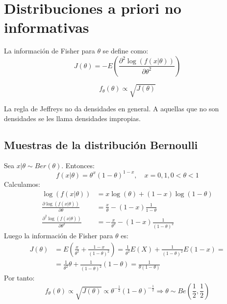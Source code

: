 \section{Distribuciones a priori no informativas}
\begin{definition}
    La información de Fisher para $\theta$ se define como:
    $$J(\theta) = -E\left(\frac{\partial^2 \log(f(x|\theta))}{\partial\theta^2}\right)$$
\end{definition}

\begin{proposition}
    $$f_\theta(\theta) \propto \sqrt{J(\theta)}$$
\end{proposition}

\begin{remark}
    La regla de Jeffreys no da densidades en general.
    A aquellas que no son densidades se les llama densidades impropias.
\end{remark}

\subsection*{Muestras de la distribución Bernoulli}
Sea $x|\theta \sim Ber(\theta)$.
Entonces:
$$f(x|\theta) = \theta^x(1-\theta)^{1-x}, \quad x = 0, 1, 0 < \theta < 1$$
Calculamos:
\begin{align*}
    \log(f(x|\theta))                                      & = x\log(\theta) + (1-x)\log(1-\theta)               \\
    \frac{\partial \log(f(x|\theta))}{\partial \theta}     & = \frac{x}{\theta} - (1-x)\frac{1}{1-\theta}        \\
    \frac{\partial^2 \log(f(x|\theta))}{\partial \theta^2} & = -\frac{x}{\theta^2} - (1-x)\frac{1}{(1-\theta)^2}
\end{align*}
Luego la información de Fisher para $\theta$ es:
\begin{align*}
    J(\theta) & = E\left(\frac{x}{\theta^2} + \frac{1-x}{(1-\theta)^2}\right) = \frac{1}{\theta^2}E(X) + \frac{1}{(1-\theta)^2}E(1-x) = \\
              & = \frac{1}{\theta^2}\theta + \frac{1}{(1-\theta)^2}(1-\theta) = \frac{1}{\theta(1-\theta)}
\end{align*}
Por tanto:
$$f_\theta(\theta) \propto \sqrt{J(\theta)} \propto \theta^{-\frac{1}{2}}(1-\theta)^{-\frac{1}{2}} \Rightarrow \theta \sim Be\left(\frac{1}{2}, \frac{1}{2}\right)$$

